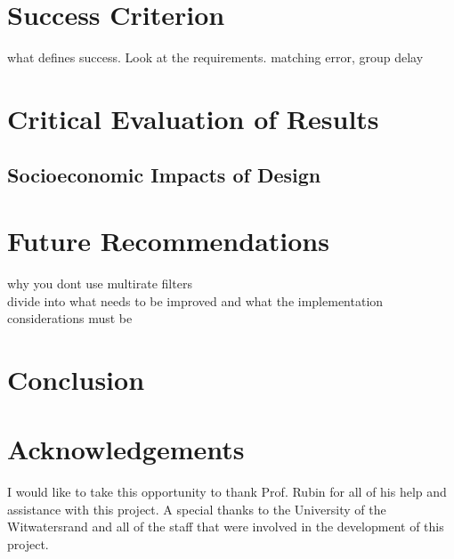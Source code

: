 \documentclass[11pt,onecolumn]{witseiepaper}
\begin{document}
\section{Success Criterion}

\noindent 

what defines success. Look at the requirements. matching error, group delay

\section{Critical Evaluation of Results}



\subsection{Socioeconomic Impacts of Design}

\section{Future Recommendations}

why you dont use multirate filters\\
divide into what needs to be improved and what the implementation considerations must be
\section{Conclusion}

\section*{Acknowledgements}

\noindent I would like to take this opportunity to thank Prof. Rubin for all of his help and assistance with this project. A special thanks to the University of the Witwatersrand and all of the staff that were involved in the development of this project.

\newpage
\printbibliography
\newpage
\end{document}
